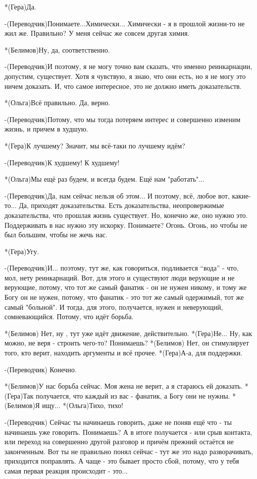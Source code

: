 *(Гера)Да.

-(Переводчик)Понимаете...Химически... Химически - я в прошлой жизни-то не жил же. Правильно? У меня сейчас же совсем другая химия.

*(Белимов)Ну, да, соответственно.

-(Переводчик)И поэтому, я не могу точно вам сказать, что именно реинкарнации, допустим, существует. Хотя я чувствую, я знаю, что они есть, но я не могу это ничем доказать. И, что самое интересное, это не должно иметь доказательств.

*(Ольга)Всё правильно. Да, верно.

-(Переводчик)Потому, что мы тогда потеряем интерес и совершенно изменим жизнь, и причем в худшую.

*(Гера)К лучшему? Значит, мы всё-таки по лучшему идём? 

-(Переводчик)К худшему! К худшему!

*(Ольга)Мы ещё раз будем, и всегда будем. Ещё нам "работать"...

-(Переводчик)Да, нам сейчас нельзя об этом... И поэтому, всё, любое вот, какие-то... Да, приходят доказательства. Есть доказательства, неопровержимые доказательства, что прошлая жизнь существует. Но, конечно же, оно нужно это. Поддерживать в нас нужно эту искорку. Понимаете? Огонь. Огонь, но чтобы не был большим, чтобы не жечь нас.

*(Гера)Угу.

-(Переводчик)И... поэтому, тут же, как говориться, подливается “вода” - что, мол, нету реинкарнаций. Вот, для этого и существуют люди верующие и не верующие, потому, что тот же самый фанатик - он не нужен никому, и тому же Богу он не нужен, потому, что фанатик - это тот же самый одержимый, тот же самый "больной". И тогда, для этого, получается, нужен и неверующий, сомневающийся. Потому, что идёт борьба.

*(Белимов) Нет, ну , тут уже идёт движение, действительно.
*(Гера)Не... Ну, как можно, не веря - строить чего-то? Понимаешь?
*(Белимов) Нет, он стимулирует того, кто верит, находить аргументы и всё прочее.
*(Гера)А-а, для поддержки.

-(Переводчик) Конечно. 

*(Белимов)У нас борьба сейчас. Моя жена не верит, а я стараюсь ей доказать.
*(Гера)Так получается, что каждый из вас - фанатик, а Богу они не нужны.
*(Белимов)Я ищу...
*(Ольга)Тихо, тихо!

-(Переводчик) Сейчас ты начинаешь говорить, даже не поняв ещё что - ты начинаешь уже говорить. Понимаешь? А в итоге получается - или срыв контакта, или переход на совершенно другой разговор и причём прежний остаётся не законченным. Вот ты не правильно понял сейчас - тут же это надо разворачивать, приходится поправлять. А чаще - это бывает просто сбой, потому, что у тебя самая первая реакция происходит - это...